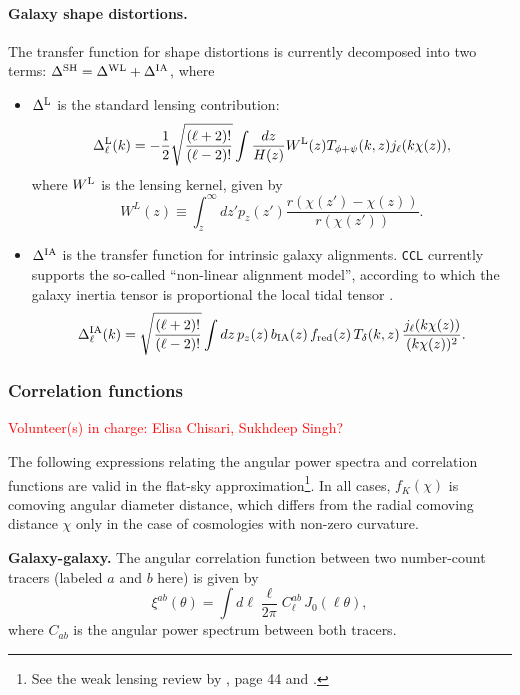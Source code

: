 \documentclass[\docopts]{\docclass}
\newcommand{\vol}[1]{\textcolor{red}{Volunteer(s) in charge: #1}}
\newcommand{\ccl}{{\tt CCL}\xspace}
\begin{document}
\paragraph{\bf Galaxy shape distortions.} The transfer function for shape distortions is currently decomposed into two terms: $\Delta^{\rm SH}=\Delta^{\rm WL}+\Delta^{\rm IA}$, where
\begin{itemize}
  \item $\Delta^{\rm L}$ is the standard lensing contribution:
        \begin{equation} \label{eq:transfer_lensing}
          \Delta_\ell^{\rm L}(k)=-\frac{1}{2}\sqrt{\frac{(\ell+2)!}{(\ell-2)!}}\int \frac{dz}{H(z)} W^{\rm L}(z) T_{\phi+\psi}(k,z) j_\ell(k\chi(z)),
        \end{equation}
        where $W^{\rm L}$ is the lensing kernel, given by
        \begin{equation}
          W^L(z)\equiv\int_z^\infty dz' p_z(z')\frac{r(\chi(z')-\chi(z))}{r(\chi(z'))}.
        \end{equation}
  \item $\Delta^{\rm IA}$ is the transfer function for intrinsic galaxy alignments. \ccl currently supports the so-called ``non-linear alignment model'', according to which the galaxy inertia tensor is proportional the local tidal tensor \cite{2004PhRvD..70f3526H,2007MNRAS.381.1197H}.
        \begin{equation}
          \Delta_\ell^{\rm IA}(k)=\sqrt{\frac{(\ell+2)!}{(\ell-2)!}}\int dz\,p_z(z)\,b_{\rm IA}(z)\,f_{\rm red}(z)\,T_\delta(k,z)\,\frac{j_\ell(k\chi(z))}{(k\chi(z))^2}.
        \end{equation}
\end{itemize}

\subsubsection{Correlation functions}
\vol{Elisa Chisari, Sukhdeep Singh?}

The following expressions relating the angular power spectra and correlation functions are valid in the flat-sky approximation\footnote{See the weak lensing review by \citet{Bartelmann01}, page 44 and \citet{Joachimi10}.}. In all cases, $f_K(\chi)$ is comoving angular diameter distance, which differs from the radial comoving distance $\chi$ only in the case of cosmologies with non-zero curvature.

{\bf Galaxy-galaxy.} The angular correlation function between two number-count tracers (labeled $a$ and $b$ here) is given by
\begin{equation}
  \xi^{ab}(\theta) = \int d\ell \frac{\ell}{2\pi} C^{ab}_\ell\, J_0(\ell\theta),
\label{eq:xiclu}
\end{equation}
where $C_{ab}$ is the angular power spectrum between both tracers.
\end{document}
